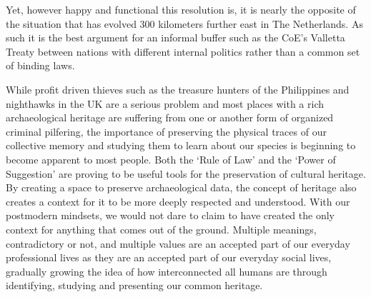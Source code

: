 \documentclass[english]{ijsra}
\begin{document}
Yet, however happy and functional this resolution is, it is nearly the opposite of the situation that has evolved 300 kilometers further east in The Netherlands. As such it is the best argument for an informal buffer such as the CoE’s Valletta Treaty between nations with different internal politics rather than a common set of binding laws. 


While profit driven thieves such as the treasure hunters of the Philippines and nighthawks in the UK are a serious problem and most places with a rich archaeological heritage are suffering from one or another form of organized criminal pilfering, the importance of preserving the physical traces of our collective memory and studying them to learn about our species is beginning to become apparent to most people. Both the ‘Rule of Law’ \parencite{RA10066} and the ‘Power of Suggestion’ \parencite{Valletta_1992} are proving to be useful tools for the preservation of cultural heritage. By creating a space to preserve archaeological data, the concept of heritage also creates a context for it to be more deeply respected and understood. With our postmodern mindsets, we would not dare to claim to have created the only context for anything that comes out of the ground. Multiple meanings, contradictory or not, and multiple values are an accepted part of our everyday professional lives as they are an accepted part of our everyday social lives, gradually growing the idea of how interconnected all humans are through identifying, studying and presenting our common heritage.





\IJSRAclosing
\end{document}
